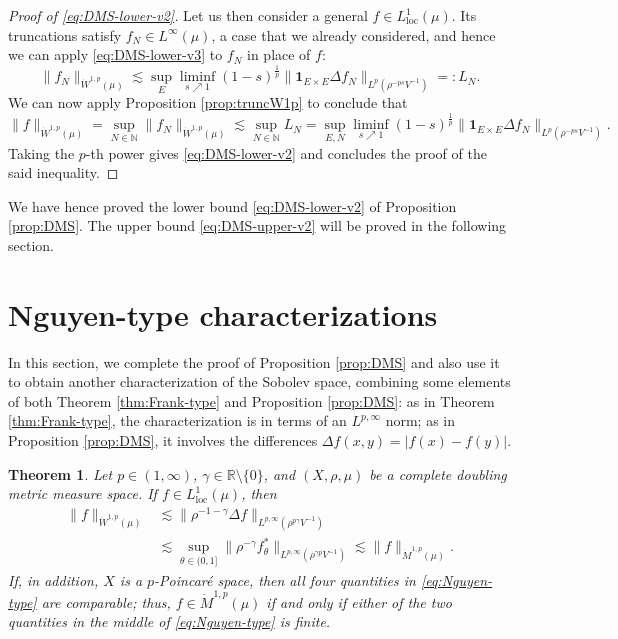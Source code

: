 \documentclass[11pt]{amsart}
\newtheorem{theorem}{Theorem}[section]
\theoremstyle{definition}
\theoremstyle{remark}
\numberwithin{equation}{section}
\newcommand{\abs}[1]{|#1|}
\newcommand{\Norm}[2]{\|#1\|_{#2}}
\begin{document}
\begin{proof}[Proof of \eqref{eq:DMS-lower-v2}]
Let us then consider a general $f\in L^1_{\mathrm{loc}}(\mu)$. Its truncations satisfy
$f_N\in L^\infty(\mu)$, a case that we already considered, and hence we can apply
\eqref{eq:DMS-lower-v3} to $f_N$ in place of $f$:
\begin{equation*}
  \Norm{f_N}{\dot W^{1,p}(\mu)}
  \lesssim\sup_E\liminf_{s\nearrow 1}(1-s)^{\frac1p}
  \Norm{\mathbf{1}_{E\times E}\Delta f_N}{L^p(\rho^{-ps}V^{-1})}=:L_N.
\end{equation*}
We can now apply Proposition \ref{prop:truncW1p} to conclude that
\begin{equation*}
  \Norm{f}{\dot W^{1,p}(\mu)}
  =\sup_{N\in\mathbb N}\Norm{f_N}{\dot W^{1,p}(\mu)}
  \lesssim\sup_{N\in\mathbb N}L_N
  =\sup_{E,N}\liminf_{s\nearrow 1}(1-s)^{\frac1p}
  \Norm{\mathbf{1}_{E\times E}\Delta f_N}{L^p(\rho^{-ps}V^{-1})}.
\end{equation*}
Taking the $p$-th power gives \eqref{eq:DMS-lower-v2} and concludes the proof
of the said inequality.
\end{proof}

We have hence proved the lower bound \eqref{eq:DMS-lower-v2} of Proposition \ref{prop:DMS}.
The upper bound \eqref{eq:DMS-upper-v2} will be proved in the following section.

\section{Nguyen-type characterizations}\label{sec:Nguyen}

In this section, we complete the proof of Proposition \ref{prop:DMS} and also use it to
obtain another characterization of the Sobolev space, combining some elements of both
Theorem \ref{thm:Frank-type} and Proposition \ref{prop:DMS}: as in Theorem
\ref{thm:Frank-type}, the characterization is in terms of an $L^{p,\infty}$ norm; as in
Proposition \ref{prop:DMS}, it involves the differences $\Delta f(x,y)=\abs{f(x)-f(y)}$.

\begin{theorem}\label{thm:Nguyen-type}
Let $p\in(1,\infty)$, $\gamma\in\mathbb{R}\setminus\{0\}$,
and $(X,\rho,\mu)$ be a complete doubling metric measure space.
If $f\in L^1_{\mathrm{loc}}(\mu)$, then
\begin{subequations}\label{eq:Nguyen-type}
\begin{align}
  \Norm{f}{\dot W^{1,p}(\mu)}
  &\lesssim\Norm{\rho^{-1-\gamma}\Delta f}{L^{p,\infty}(\rho^{p\gamma}V^{-1})}
    \label{eq:Nguyen-lower} \\
  &\lesssim\sup_{\theta\in(0,1]}
    \Norm{\rho^{-\gamma} f_\theta^*}{L^{p,\infty}(\rho^{\gamma p}V^{-1})}
   \lesssim\Norm{f}{\dot M^{1,p}(\mu)}.
   \label{eq:Nguyen-upper}
\end{align}
\end{subequations}
If, in addition, $X$ is a $p$-Poincar\'e space, then all four quantities in
\eqref{eq:Nguyen-type} are comparable; thus, $f\in\dot M^{1,p}(\mu)$ if and only if either of
the two quantities in the middle of \eqref{eq:Nguyen-type} is finite.
\end{theorem}
\end{document}

